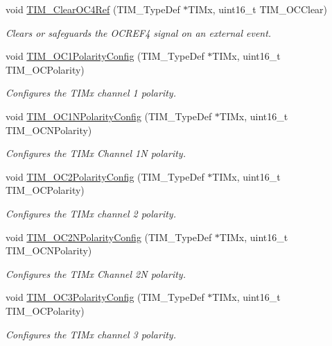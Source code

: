 \begin{DoxyCompactItemize}
void \hyperlink{group___t_i_m___group2_gaeee5fa66b26e7c6f71850272dc3028f3}{T\-I\-M\-\_\-\-Clear\-O\-C4\-Ref} (T\-I\-M\-\_\-\-Type\-Def $\ast$T\-I\-Mx, uint16\-\_\-t T\-I\-M\-\_\-\-O\-C\-Clear)
\begin{DoxyCompactList}\small\item\em Clears or safeguards the O\-C\-R\-E\-F4 signal on an external event. \end{DoxyCompactList}\item 
void \hyperlink{group___t_i_m___group2_ga03878f78163485c8a3508cff2111c297}{T\-I\-M\-\_\-\-O\-C1\-Polarity\-Config} (T\-I\-M\-\_\-\-Type\-Def $\ast$T\-I\-Mx, uint16\-\_\-t T\-I\-M\-\_\-\-O\-C\-Polarity)
\begin{DoxyCompactList}\small\item\em Configures the T\-I\-Mx channel 1 polarity. \end{DoxyCompactList}\item 
void \hyperlink{group___t_i_m___group2_ga3cb91578e7dd34ea7d09862482960445}{T\-I\-M\-\_\-\-O\-C1\-N\-Polarity\-Config} (T\-I\-M\-\_\-\-Type\-Def $\ast$T\-I\-Mx, uint16\-\_\-t T\-I\-M\-\_\-\-O\-C\-N\-Polarity)
\begin{DoxyCompactList}\small\item\em Configures the T\-I\-Mx Channel 1\-N polarity. \end{DoxyCompactList}\item 
void \hyperlink{group___t_i_m___group2_ga6831cacaac1ef50291af94db94450797}{T\-I\-M\-\_\-\-O\-C2\-Polarity\-Config} (T\-I\-M\-\_\-\-Type\-Def $\ast$T\-I\-Mx, uint16\-\_\-t T\-I\-M\-\_\-\-O\-C\-Polarity)
\begin{DoxyCompactList}\small\item\em Configures the T\-I\-Mx channel 2 polarity. \end{DoxyCompactList}\item 
void \hyperlink{group___t_i_m___group2_ga2fa6ea3a89f446b52b4e699272b70cad}{T\-I\-M\-\_\-\-O\-C2\-N\-Polarity\-Config} (T\-I\-M\-\_\-\-Type\-Def $\ast$T\-I\-Mx, uint16\-\_\-t T\-I\-M\-\_\-\-O\-C\-N\-Polarity)
\begin{DoxyCompactList}\small\item\em Configures the T\-I\-Mx Channel 2\-N polarity. \end{DoxyCompactList}\item 
void \hyperlink{group___t_i_m___group2_ga1ef43b03fe666495e80aac9741ae7ab0}{T\-I\-M\-\_\-\-O\-C3\-Polarity\-Config} (T\-I\-M\-\_\-\-Type\-Def $\ast$T\-I\-Mx, uint16\-\_\-t T\-I\-M\-\_\-\-O\-C\-Polarity)
\begin{DoxyCompactList}\small\item\em Configures the T\-I\-Mx channel 3 polarity. \end{DoxyCompactList}\item 

\end{DoxyCompactItemize}
